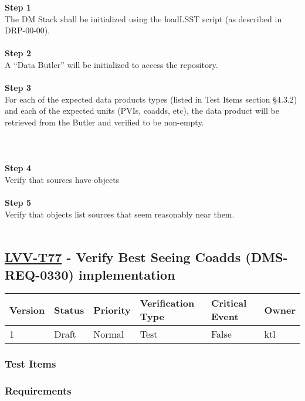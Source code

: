 \textbf{Step 1}\\
The DM Stack shall be initialized using the loadLSST script (as
described in DRP-00-00).\\
~\\
\textbf{Step 2}\\
A ``Data Butler'' will be initialized to access the repository.\\
~\\
\textbf{Step 3}\\
For each of the expected data products types (listed in Test Items
section §4.3.2) and each of the expected units (PVIs, coadds, etc), the
data product will be retrieved from the Butler and verified to be
non-empty.\\
~\\
~\\
~\\
\textbf{Step 4}\\
Verify that sources have objects\\
~\\
\textbf{Step 5}\\
Verify that objects list sources that seem reasonably near them.\\
~\\

\hypertarget{lvv-t77---verify-best-seeing-coadds-dms-req-0330-implementation}{%
\subsection{\texorpdfstring{\href{https://jira.lsstcorp.org/secure/Tests.jspa\#/testCase/LVV-T77}{LVV-T77}
- Verify Best Seeing Coadds (DMS-REQ-0330)
implementation}{LVV-T77 - Verify Best Seeing Coadds (DMS-REQ-0330) implementation}}\label{lvv-t77---verify-best-seeing-coadds-dms-req-0330-implementation}}

\begin{longtable}[]{@{}llllll@{}}
\toprule
Version & Status & Priority & Verification Type & Critical Event &
Owner\tabularnewline
\midrule
\endhead
1 & Draft & Normal & Test & False & ktl\tabularnewline
\bottomrule
\end{longtable}

\hypertarget{test-items-1}{%
\subsubsection{Test Items}\label{test-items-1}}

\hypertarget{requirements-2}{%
\subsubsection{Requirements}\label{requirements-2}}

